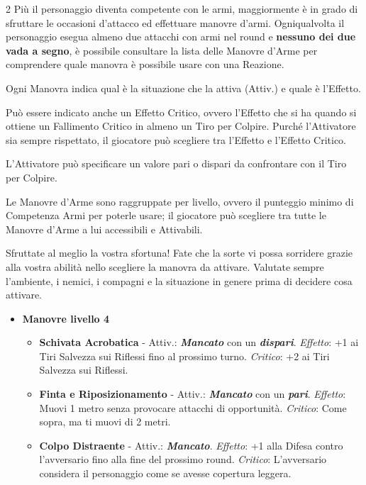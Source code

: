 \begin{multicols}{2}
Più il personaggio diventa competente con le armi, maggiormente è in grado di sfruttare le occasioni d'attacco ed effettuare manovre d'armi. Ogniqualvolta il personaggio esegua almeno due attacchi con armi nel round e \textbf{nessuno dei due vada a segno}, è possibile consultare la lista delle Manovre d'Arme per comprendere quale manovra è possibile usare con una Reazione.

Ogni Manovra indica qual è la situazione che la attiva (Attiv.) e quale è l'Effetto.

Può essere indicato anche un Effetto Critico, ovvero l'Effetto che si ha quando si ottiene un Fallimento Critico in almeno un Tiro per Colpire. Purché l'Attivatore sia sempre rispettato, il giocatore può scegliere tra l'Effetto e l'Effetto Critico.

L'Attivatore può specificare un valore pari o dispari da confrontare con il Tiro per Colpire.

Le Manovre d'Arme sono raggruppate per livello, ovvero il punteggio minimo di Competenza Armi per poterle usare; il giocatore può scegliere tra tutte le Manovre d'Arme a lui accessibili e Attivabili.

\begin{giocatore}[Ho mancato!]
		Sfruttate al meglio la vostra sfortuna! Fate che la sorte vi possa sorridere grazie alla vostra abilità nello scegliere la manovra da attivare. Valutate sempre l'ambiente, i nemici, i compagni e la situazione in genere prima di decidere cosa attivare.
\end{giocatore}

\begin{itemize}[leftmargin=*]
	\setlength{\itemsep}{0pt}

	\item \textbf{Manovre livello 4}
	\begin{itemize}[leftmargin=*]
		\setlength{\itemsep}{0pt}
		\item \textbf{Schivata Acrobatica} - Attiv.: \textbf{\emph{Mancato}} con un \textbf{\emph{dispari}}. \emph{Effetto}: +1 ai Tiri Salvezza sui Riflessi fino al prossimo turno. \emph{Critico}: +2 ai Tiri Salvezza sui Riflessi.

		\item \textbf{Finta e Riposizionamento} - Attiv.: \textbf{\emph{Mancato}} con un \textbf{\emph{pari}}. \emph{Effetto}: Muovi 1 metro senza provocare attacchi di opportunità. \emph{Critico}: Come sopra, ma ti muovi di 2 metri.

		\item \textbf{Colpo Distraente} - Attiv.: \textbf{\emph{Mancato}}. \emph{Effetto}: +1 alla Difesa contro l'avversario fino alla fine del prossimo round. \emph{Critico}: L'avversario considera il personaggio come se avesse copertura leggera.


\end{itemize}
\end{itemize}
\end{multicols}
